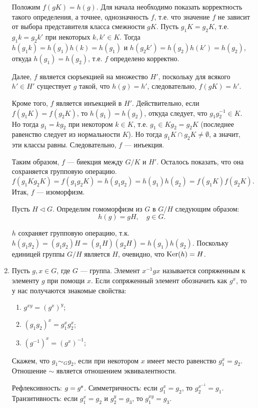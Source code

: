\begin{enumerate}
Положим $f(gK)=h(g)$. Для начала необходимо показать корректность такого определения, а точнее, однозначность $f$, т.е. что значение $f$ не зависит от выбора представителя класса смежности $gK$.
Пусть $g_1K=g_2K$, т.е. $g_1k=g_2k'$ при некоторых $k,k'\in K$. Тогда $h(g_1k)=h(g_1)h(k)=h(g_1)$ и $h(g_2k')=h(g_2)h(k')=h(g_2)$, откуда $h(g_1)=h(g_2)$, т.е. $f$ определено корректно.

Далее, $f$ является сюръекцией на множество $H'$, поскольку для всякого $h'\in H'$ существует $g$ такой, что $h(g)=h'$, следовательно, $f(gK)=h'$.

Кроме того, $f$ является инъекцией в $H'$. Действительно, если $f(g_1K)=f(g_2K)$, то $h(g_1)=h(g_2)$, откуда следует, что $g_1g_2^{-1}\in K$. Но тогда $g_1=kg_2$ при некотором $k\in K$, т.е. $g_1\in Kg_2=g_2K$ (последнее равенство следует из нормальности $K$). Но тогда $g_1K\cap g_2K\ne\emptyset$, а значит, эти классы равны. Следовательно, $f$ --- инъекция.

Таким образом, $f$ --- биекция между $G/K$ и $H'$. Осталось показать, что она сохраняется групповую операцию.
$$
f(g_1Kg_2K)=f(g_1g_2K)=h(g_1g_2)=h(g_1)h(g_2)=f(g_1K)f(g_2K).
$$
Итак, $f$ --- изоморфизм.

Пусть $H\vartriangleleft G$. Определим гомоморфизм из $G$ в $G/H$ следующим образом:
$$
h(g)=gH, \quad g\in G.
$$

$h$ сохраняет групповую операцию, т.к. $h(g_1g_2)=(g_1g_2)H=(g_1H)(g_2H)=h(g_1)h(g_2)$. Поскольку единицей группы $G/H$ является $H$, очевидно, что $\mathop{\mathrm{Ker}}(h)=H$.
\epf

\item Пусть $g,x\in G$, где $G$ --- группа. Элемент $x^{-1}gx$ называется сопряженным к элементу $g$ при помощи $x$. Если сопряженный элемент обозначить как $g^x$, то у нас получаются знакомые свойства:
\begin{enumerate}[1)]
\item $g^{xy}=(g^x)^y$;
\item $(g_1g_2)^x=g_1^xg_2^x$;
\item $(g^{-1})^x=(g^x)^{-1}$;
\end{enumerate}

\begin{lem} Скажем, что $g_1\sim_G g_2$, если при некотором $x$ имеет место равенство $g_1^x=g_2$. Отношение $\sim$ является отношением эквивалентности.
\end{lem}
\pf Рефлексивность: $g=g^\mathsf e$. Симметричность: если $g_1^x=g_2$, то $g_2^{x^{-1}}=g_1$. Транзитивность: если $g_1^x=g_2$ и $g_2^y=g_3$, то $g_1^{xy}=g_3$.
\epf


\end{enumerate}
